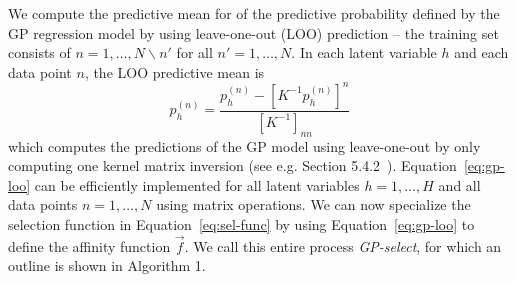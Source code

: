 We compute the predictive mean for of the predictive probability defined by the GP regression model  by using
leave-one-out (LOO) prediction -- the training set consists of $n= 1, \dots,N \backslash n'$ for all $n'=1,\dots, N$.
In each latent variable $h$ and each data point $n$, the LOO predictive mean is
%
\vspace{-.2cm}  %
\begin{equation}\label{eq:gp-loo}
p_{h}^{(n)} =   
\frac{ p_{h}^{(n)} - [ K^{-1} p_{h}^{(n)} ]^{n} }{ [ K^{-1} ]_{nn} }
\end{equation}
\vspace{-.0cm}
%
which computes the predictions of the GP model using leave-one-out by only computing one kernel matrix inversion
(see e.g. Section 5.4.2~\citep{RasmussenGPbook}).
%
Equation~\eqref{eq:gp-loo} can be efficiently implemented for all latent variables $h=1,\dots,H$ and all data points $n=1,\dots,N$ using matrix operations.
%
%
%
We can now specialize the selection function in Equation~\eqref{eq:sel-func} by using Equation~\eqref{eq:gp-loo} to define the affinity function $\vec{f}$.
%
We call this entire process \textit{GP-select}, for which an outline is shown in Algorithm 1.

